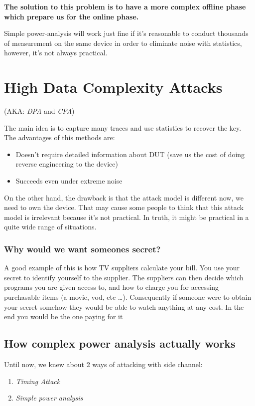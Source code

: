\textbf{The solution to this problem is to have a more complex offline phase which prepare us for the online phase.}

Simple power-analysis will work just fine if it's reasonable to conduct
thousands of measurement on the same device in order to eliminate noise with
statistics, however, it's not always practical.

\section{High Data Complexity Attacks}

(AKA: \textit{DPA} and \textit{CPA})

The main idea is to capture many traces and use statistics to recover the key.
The advantages of this methods are:
\begin{itemize}
    \item Doesn't require detailed information about DUT (save us the cost of
    doing reverse engineering to the device)
    \item Succeeds even under extreme noise
\end{itemize}

On the other hand, the drawback is that the attack model is different now, we
need to own the device. That may cause some people to think that this attack
model is irrelevant because it's not practical. In truth, it might be practical
in a quite wide range of situations.

\subsubsection{Why would we want someones secret?}

A good example of this is how TV suppliers calculate your bill.
You use your secret to identify yourself to the supplier. The suppliers can then decide which programs you are given access to, and how to charge you for accessing purchasable items (a movie, vod, etc \ldots). 
Consequently if someone were to obtain your secret somehow they would be able to watch anything at any cost. In the end you would be the one paying for it

\subsection{How complex power analysis actually works}

Until now, we knew about 2 ways of attacking with side channel:
\begin{enumerate}
    \item \textit{Timing Attack}
    \item \textit{Simple power analysis}
\end{enumerate}

